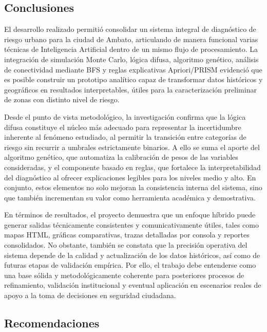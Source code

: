 \documentclass[11pt]{article}
\begin{document}
\subsection{Conclusiones}

El desarrollo realizado permitió consolidar un sistema integral de diagnóstico de riesgo urbano para la ciudad de Ambato, articulando de manera funcional varias técnicas de Inteligencia Artificial dentro de un mismo flujo de procesamiento. La integración de simulación Monte Carlo, lógica difusa, algoritmo genético, análisis de conectividad mediante BFS y reglas explicativas Apriori/PRISM evidenció que es posible construir un prototipo analítico capaz de transformar datos históricos y geográficos en resultados interpretables, útiles para la caracterización preliminar de zonas con distinto nivel de riesgo.

Desde el punto de vista metodológico, la investigación confirma que la lógica difusa constituye el núcleo más adecuado para representar la incertidumbre inherente al fenómeno estudiado, al permitir la transición entre categorías de riesgo sin recurrir a umbrales estrictamente binarios. A ello se suma el aporte del algoritmo genético, que automatiza la calibración de pesos de las variables consideradas, y el componente basado en reglas, que fortalece la interpretabilidad del diagnóstico al ofrecer explicaciones legibles para los niveles medio y alto. En conjunto, estos elementos no solo mejoran la consistencia interna del sistema, sino que también incrementan su valor como herramienta académica y demostrativa.

En términos de resultados, el proyecto demuestra que un enfoque híbrido puede generar salidas técnicamente consistentes y comunicativamente útiles, tales como mapas HTML, gráficas comparativas, trazas detalladas por consola y reportes consolidados. No obstante, también se constata que la precisión operativa del sistema depende de la calidad y actualización de los datos históricos, así como de futuras etapas de validación empírica. Por ello, el trabajo debe entenderse como una base sólida y metodológicamente coherente para posteriores procesos de refinamiento, validación institucional y eventual aplicación en escenarios reales de apoyo a la toma de decisiones en seguridad ciudadana.

\subsection{Recomendaciones}
\end{document}
